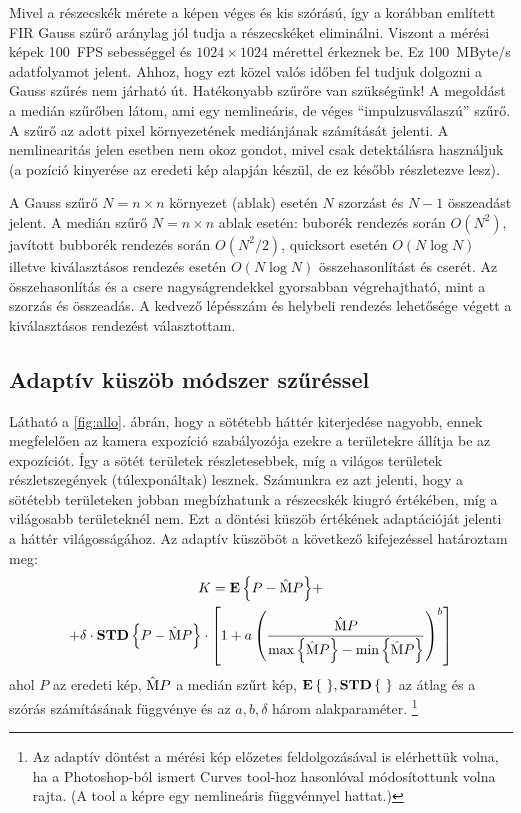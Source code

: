 	Mivel a részecskék mérete a képen véges és kis szórású, így a korábban
	említett FIR Gauss szűrő aránylag jól tudja a részecskéket eliminálni.
	Viszont a mérési képek 100~FPS sebességgel és $1024\times1024$ mérettel érkeznek be.
	Ez 100~MByte/s adatfolyamot jelent. Ahhoz, hogy ezt közel
        valós időben fel tudjuk dolgozni
	a Gauss szűrés nem járható út. Hatékonyabb szűrőre van szükségünk! A megoldást a medián szűrőben látom,
	ami egy nemlineáris, de véges ``impulzusválaszú'' szűrő.
	A szűrő az adott pixel környezetének mediánjának számítását jelenti.
	A nemlinearitás jelen esetben nem okoz gondot, mivel csak detektálásra használjuk (a pozíció
	kinyerése az eredeti kép alapján készül, de ez később részletezve lesz).
	
	A Gauss szűrő $N = n\times n$ környezet (ablak) esetén $N$ szorzást és $N-1$ összeadást jelent. A medián szűrő $N = n\times n$
	ablak esetén: buborék rendezés során $O(N^2)$, javított bubborék rendezés során $O(N^2 / 2)$, quicksort esetén $O(N\log N)$
	illetve kiválasztásos rendezés esetén $O(N\log N)$ összehasonlítást és cserét.
	Az összehasonlítás és a csere nagyságrendekkel gyorsabban végrehajtható, mint a szorzás és
	összeadás. A kedvező lépésszám és helybeli rendezés lehetősége végett a kiválasztásos rendezést választottam.
	
\subsection{Adaptív küszöb módszer szűréssel}
	Látható a \ref{fig:allo}. ábrán, hogy a sötétebb háttér kiterjedése nagyobb, ennek megfelelően az
	kamera expozíció szabályozója ezekre a területekre állítja be az expozíciót.
	Így a sötét területek részletesebbek, míg a világos területek részletszegények (túlexponáltak) lesznek.
	Számunkra ez azt jelenti, hogy a sötétebb területeken jobban megbízhatunk a részecskék kiugró
	értékében, míg a világosabb területeknél nem.
	Ezt a döntési küszöb értékének adaptációját jelenti a háttér világosságához.
	Az adaptív küszöböt a következő kifejezéssel határoztam meg:
	\begin{multline}
		\label{eq:treshold}
		K = {\mathop{\bf E\/}\left\{P-\mathrm{\hat{M}}P\right\}}+\\
		  + \delta \cdot {\mathop{\bf STD\/}\left\{P - \mathrm{\hat{M}}P\right\}} \cdot 
		\left[ 1+ a \left(
			\frac{\mathrm{\hat{M}}P}{\max\left\{\mathrm{\hat{M}}P\right\} - \min\left\{\mathrm{\hat{M}}P\right\}}
			\right)^b
		\right]
	\end{multline}
	ahol $P$ az eredeti kép, $\mathrm{\hat{M}} P$ a medián szűrt kép, ${\mathop{\bf E\/}\left\{\ \right\}}, {\mathop{\bf STD\/}\left\{\ \right\}}$ az
	átlag és a szórás számításának függvénye és az $a, b, \delta$ három alakparaméter.
	\footnote{Az adaptív döntést a mérési kép előzetes feldolgozásával is elérhettük volna,
	ha a Photoshop-ból ismert Curves tool-hoz hasonlóval módosítottunk volna rajta. (A tool a képre egy nemlineáris
	függvénnyel hattat.)}
	
